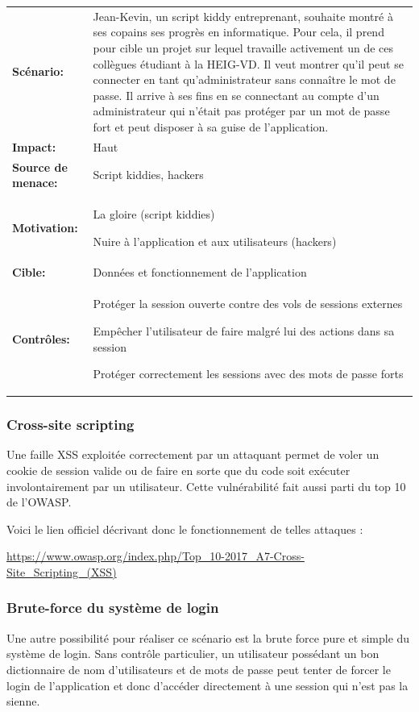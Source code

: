 \documentclass[12pt]{article}
\begin{document}
\renewcommand{\arraystretch}{1.6}
\begin{tabular}{@{}p{4cm}p{12cm}}
\textbf{Scénario:} &  Jean-Kevin, un script kiddy entreprenant, souhaite montré à ses copains ses progrès en informatique. Pour cela, il prend pour cible un projet sur lequel travaille activement un de ces collègues étudiant à la HEIG-VD. Il veut montrer qu'il peut se connecter en tant qu'administrateur sans connaître le
mot de passe. Il arrive à ses fins en se connectant au compte d'un
administrateur qui n'était pas protéger par un mot de passe fort et
peut disposer à sa guise de l'application.\\
\textbf{Impact:} & Haut \\
\textbf{Source de menace: } & Script kiddies, hackers \\
\textbf{Motivation:} & La gloire (script kiddies)

Nuire à l'application et aux utilisateurs (hackers)\\
\textbf{Cible:} & Données et fonctionnement de l'application \\
\textbf{Contrôles:} & Protéger la session ouverte contre des vols de sessions externes

Empêcher l'utilisateur de faire malgré lui des actions dans sa session

Protéger correctement les sessions avec des mots de passe forts
\end{tabular}
\renewcommand{\arraystretch}{1}

\subsubsection{Cross-site scripting}

Une faille XSS exploitée correctement par un attaquant permet de voler un cookie de session valide ou de faire en sorte que du code soit exécuter involontairement par un utilisateur. Cette vulnérabilité fait aussi parti du top 10 de l'OWASP. 

Voici le lien officiel décrivant donc le fonctionnement de telles attaques : 

\url{https://www.owasp.org/index.php/Top_10-2017_A7-Cross-Site_Scripting_(XSS)}

\subsubsection{Brute-force du système de login}

Une autre possibilité pour réaliser ce scénario est la brute force pure et simple du système de login. Sans contrôle particulier, un utilisateur possédant un bon dictionnaire de nom d'utilisateurs et de mots de
passe peut tenter de forcer le login de l'application et donc d'accéder directement à une session qui n'est pas la sienne.
\end{document}
